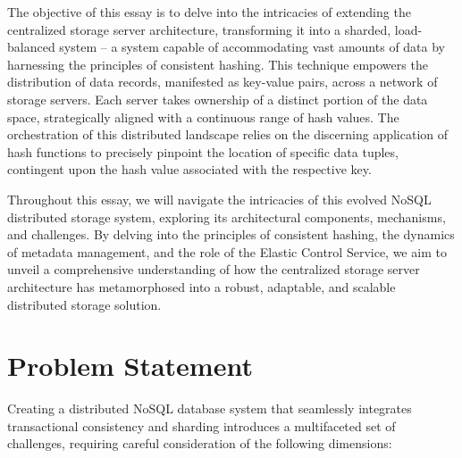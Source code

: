 \documentclass[sigconf]{acmart}
\begin{document}
The objective of this essay is to delve into the intricacies of extending the centralized storage server architecture, transforming it into a sharded, load-balanced system – a system capable of accommodating vast amounts of data by harnessing the principles of consistent hashing. This technique empowers the distribution of data records, manifested as key-value pairs, across a network of storage servers. Each server takes ownership of a distinct portion of the data space, strategically aligned with a continuous range of hash values. The orchestration of this distributed landscape relies on the discerning application of hash functions to precisely pinpoint the location of specific data tuples, contingent upon the hash value associated with the respective key.

Throughout this essay, we will navigate the intricacies of this evolved NoSQL distributed storage system, exploring its architectural components, mechanisms, and challenges. By delving into the principles of consistent hashing, the dynamics of metadata management, and the role of the Elastic Control Service, we aim to unveil a comprehensive understanding of how the centralized storage server architecture has metamorphosed into a robust, adaptable, and scalable distributed storage solution.





\section{Problem Statement}
Creating a distributed NoSQL database system that seamlessly integrates transactional consistency and sharding introduces a multifaceted set of challenges, requiring careful consideration of the following dimensions:
\end{document}
